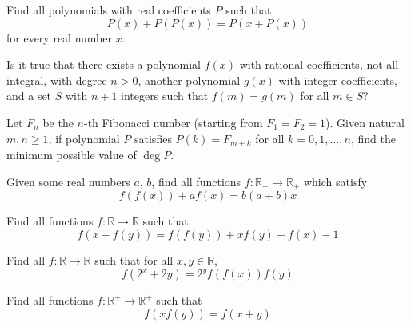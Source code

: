 


 {Find all polynomials with real coefficients $P$ such that
\[P(x) + P(P(x)) = P(x+P(x))\]
for every real number $x$.}

 {Is it true that there exists a polynomial $f(x)$ with rational coefficients, not all integral, with degree $n > 0$, another polynomial $g(x)$ with integer coefficients, and a set $S$ with $n+1$ integers such that $f(m) = g(m)$ for all $m \in S$?}

 {Let $F_n$ be the $n$-th Fibonacci number (starting from $F_1=F_2=1$). Given natural $m,n\ge 1$, if polynomial $P$ satisfies $P(k)=F_{m+k}$ for all $k=0,1,...,n$, find the minimum possible value of $\deg P$.}




 {Given some real numbers $a$, $b$, find all functions $f: \mathbb{R}_+\rightarrow\mathbb{R}_+$ which satisfy
\[f(f(x))+af(x)=b(a+b)x\]}

 {Find all functions $f: \mathbb{R}\rightarrow\mathbb{R}$ such that
\[f(x-f(y))=f(f(y))+xf(y)+f(x)-1\]}

 {Find all $f:\mathbb{R}\rightarrow \mathbb{R}$ such that for all $x,y\in\mathbb{R}$,
$$f(2^x+2y) = 2^yf(f(x))f(y)$$}



 {Find all functions $f: \mathbb{R^+}\rightarrow\mathbb{R^+}$ such that
\[f(xf(y)) = f(x+y)\]}




